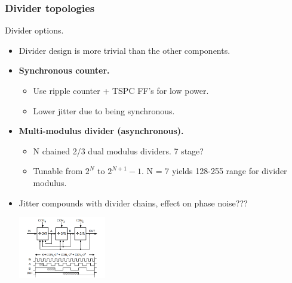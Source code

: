\documentclass[t, screen, aspectratio=43]{beamer}
\begin{document}
\begin{frame}
	\frametitle{Divider topologies}
	\begin{block}{Divider options.}
		\begin{itemize}
			\scriptsize
			\item Divider design is more trivial than the other components.
			\item \textbf{Synchronous counter.} 
			\begin{itemize}
				\scriptsize
				\item Use ripple counter + TSPC FF's for low power.
				\item Lower jitter due to being synchronous.
			\end{itemize}
			\item \textbf{Multi-modulus divider (asynchronous).}
			\begin{itemize}
				\scriptsize
				\item N chained 2/3 dual modulus dividers. 7 stage? 
				\item Tunable from $2^N$ to $2^{N+1}-1$. N = 7 yields 128-255 range for divider modulus.
			\end{itemize}
			\item Jitter compounds with divider chains, effect on phase noise???

			\vspace{-0.5em}
			\center\includegraphics[width=0.3\textwidth, angle=0]{multimod_div.png}
			\vspace{-0.5em}
		\end{itemize} 	
	\end{block}
\end{frame}




\end{document}
